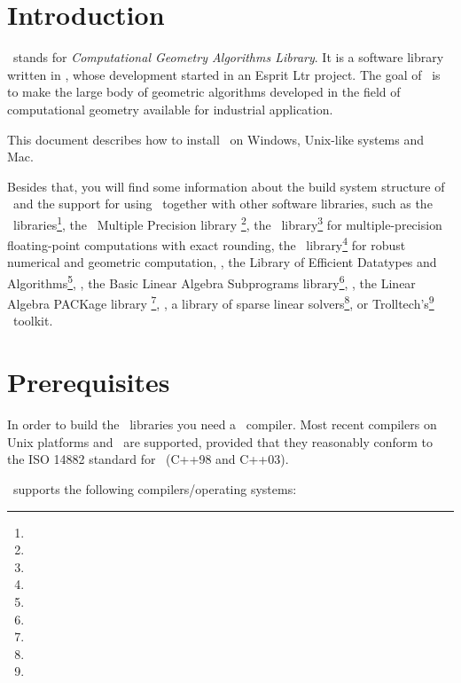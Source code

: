 \newcommand{\TTindex}[1]{\index{#1@{\tt #1}}}
\newcommand{\TTsubindex}[2]{\index{#1@{\tt #1}!{#2}}}
\newcommand{\TTsubindextwo}[2]{\index{#1!#2@{\tt #2} }}

\section{Introduction}

\cgal\ stands for \textit{Computational Geometry Algorithms Library}.
It is a software library written in \CC, whose development started in
an {\sc Esprit Ltr} project. The goal of \cgal\ is to make the large
body of geometric algorithms developed in the field of computational
geometry available for industrial application.

This document describes how to install \cgal\ on Windows, Unix-like systems and Mac.

Besides that, you will find some information about the build system
structure of \cgal\ and the support for using \cgal\ together with
other software libraries, such as the \boost\
libraries\footnote{\boostpage}, the \gnu\ Multiple Precision library
\gmp\footnote{\gmppage}, the \mpfr\ library\footnote{\mpfrpage} for
multiple-precision floating-point computations with exact rounding,
the \core\ library\footnote{\corepage} for robust numerical and
geometric computation, \leda, the Library of Efficient Datatypes and
Algorithms\footnote{\ledapage}, \blas, the Basic Linear Algebra Subprograms
library\footnote{\blaspage}, \lapack, the Linear Algebra PACKage library
\footnote{\lapackpage}, \taucs, a library of sparse linear
solvers\footnote{\taucspage}, or Trolltech's\footnote{\trolltechpage}
\qt\ toolkit.

\section{Prerequisites\label{sec:prerequisites}}

In order to build the \cgal\ libraries you need a \CC\ compiler.  Most
recent compilers on Unix platforms and \mswin\ are supported, provided
that they reasonably conform to the ISO 14882 standard for \CC\ (C++98
and C++03).

\cgaldir\ supports the following compilers/operating systems:

